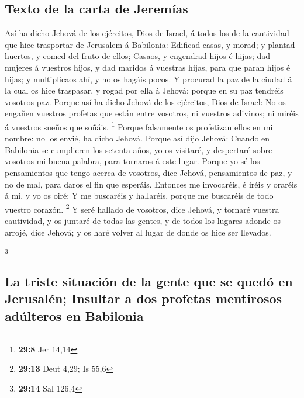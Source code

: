 \hypertarget{texto-de-la-carta-de-jeremuxedas}{%
\subsection{Texto de la carta de
Jeremías}\label{texto-de-la-carta-de-jeremuxedas}}

 Así ha dicho Jehová de los ejércitos, Dios de Israel, á
todos los de la cautividad que hice trasportar de Jerusalem á Babilonia:
 Edificad casas, y morad; y plantad huertos, y comed del
fruto de ellos;  Casaos, y engendrad hijos é hijas; dad
mujeres á vuestros hijos, y dad maridos á vuestras hijas, para que paran
hijos é hijas; y multiplicaos ahí, y no os hagáis pocos.  Y
procurad la paz de la ciudad á la cual os hice traspasar, y rogad por
ella á Jehová; porque en su paz tendréis vosotros paz. 
Porque así ha dicho Jehová de los ejércitos, Dios de Israel: No os
engañen vuestros profetas que están entre vosotros, ni vuestros
adivinos; ni miréis á vuestros sueños que soñáis. \footnote{\textbf{29:8}
  Jer 14,14}  Porque falsamente os profetizan ellos en mi
nombre: no los envié, ha dicho Jehová.  Porque así dijo
Jehová: Cuando en Babilonia se cumplieren los setenta años, yo os
visitaré, y despertaré sobre vosotros mi buena palabra, para tornaros á
este lugar.  Porque yo sé los pensamientos que tengo acerca
de vosotros, dice Jehová, pensamientos de paz, y no de mal, para daros
el fin que esperáis.  Entonces me invocaréis, é iréis y
oraréis á mí, y yo os oiré:  Y me buscaréis y hallaréis,
porque me buscaréis de todo vuestro corazón. \footnote{\textbf{29:13}
  Deut 4,29; Is 55,6}  Y seré hallado de vosotros, dice
Jehová, y tornaré vuestra cautividad, y os juntaré de todas las gentes,
y de todos los lugares adonde os arrojé, dice Jehová; y os haré volver
al lugar de donde os hice ser llevados.

\footnote{\textbf{29:14} Sal 126,4}

\hypertarget{la-triste-situaciuxf3n-de-la-gente-que-se-queduxf3-en-jerusaluxe9n-insultar-a-dos-profetas-mentirosos-aduxfalteros-en-babilonia}{%
\subsection{La triste situación de la gente que se quedó en Jerusalén;
Insultar a dos profetas mentirosos adúlteros en
Babilonia}\label{la-triste-situaciuxf3n-de-la-gente-que-se-queduxf3-en-jerusaluxe9n-insultar-a-dos-profetas-mentirosos-aduxfalteros-en-babilonia}}

